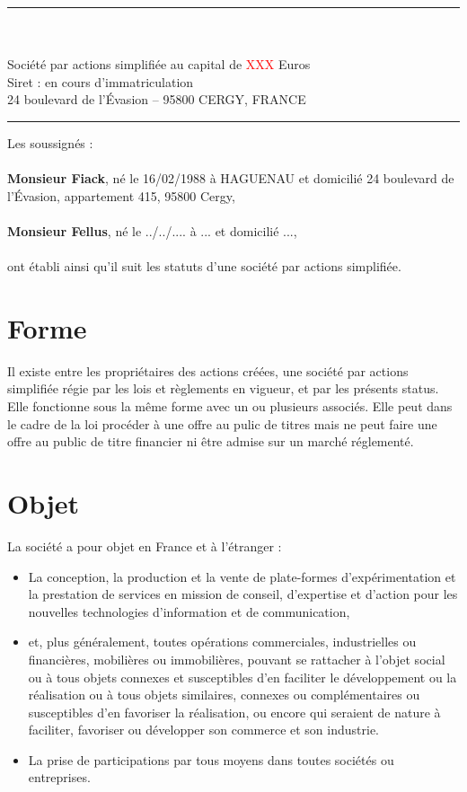 \documentclass[a4paper,12pt]{report}
\newcommand{\address}{24 boulevard de l'Évasion -- 95800 CERGY, FRANCE}
\begin{document}


\begin{center}
	\begin{minipage}{0.8\linewidth}
		\center
		\rule{\linewidth}{0.5mm}\\
		\large{}\\
		\normalsize
		Société par actions simplifiée au capital de \textcolor{red}{XXX} Euros\\
		Siret : en cours d'immatriculation\\
		\normalsize{\address}\\
		\rule{\linewidth}{0.5mm}
	\end{minipage}
\end{center}
\vspace{5mm}
\noindent Les soussignés :\\\\
\textbf{Monsieur Fiack}, né le 16/02/1988 à HAGUENAU et domicilié 24 boulevard de l'Évasion, appartement 415, 95800 Cergy,\\\\
\textbf{Monsieur Fellus}, né le ../../.... à ... et domicilié ...,\\\\
ont établi ainsi qu'il suit les statuts d'une société par actions simplifiée.

\section{Forme}
Il existe entre les propriétaires des actions créées, une société par actions simplifiée régie par les lois et règlements en vigueur, et par les présents status.
Elle fonctionne sous la même forme avec un ou plusieurs associés.
Elle peut dans le cadre de la loi procéder à une offre au pulic de titres mais ne peut faire une offre au public de titre financier ni être admise sur un marché réglementé.

\section{Objet}
La société a pour objet en France et à l'étranger :
\begin{itemize}
	\item La conception, la production et la vente de plate-formes d'expérimentation et la prestation de services en mission de conseil, d'expertise et d'action pour les nouvelles technologies d'information et de communication,
	\item et, plus généralement, toutes opérations commerciales, industrielles ou financières, mobilières ou immobilières,
		pouvant se rattacher à l'objet social ou à tous objets connexes et susceptibles d'en faciliter le développement ou la réalisation ou à tous objets similaires, 
		connexes ou complémentaires ou susceptibles d'en favoriser la réalisation, ou encore qui seraient de nature à faciliter, favoriser ou développer son commerce et son industrie.
	\item La prise de participations par tous moyens dans toutes sociétés ou entreprises.
\end{itemize}
\end{document}
